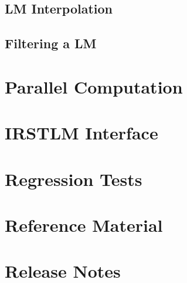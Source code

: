\documentclass[11pt]{article}
\begin{document}
\newpage
\subsection{LM Interpolation}
\label{sec:LMInterpolation}


\newpage
\subsection{Filtering a LM}
\label{sec:LMFiltering}


\newpage
\section{Parallel Computation}
\label{sec:ParallelComputation}


\newpage
\section{IRSTLM Interface}
\label{sec:LMInterface}


\newpage
\section{Regression Tests}
\label{sec:regressionTests}


\appendix


\newpage
\section{Reference Material}
\label{sec:ReferenceMaterial}


\newpage
\section{Release Notes}
\label{sec:releaseNotes}

\end{document}
